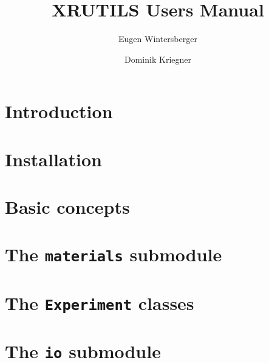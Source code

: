 \documentclass[a4paper]{book}
\title{{\Huge XRUTILS Users Manual}}
\author{Eugen Wintersberger \and Dominik Kriegner}
\begin{document}
\maketitle
\tableofcontents

\chapter{Introduction}


\chapter{Installation}


\chapter{Basic concepts}


\chapter[The materials submodule]{The {\tt materials} submodule}


\chapter[The Experiment classes]{The {\tt Experiment} classes}


\chapter[The io submodule]{The {\tt io} submodule}

\end{document}
